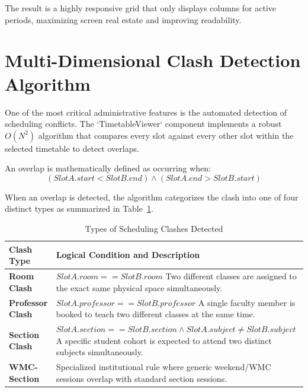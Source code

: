 The result is a highly responsive grid that only displays columns for active periods, maximizing screen real estate and improving readability.

\section{Multi-Dimensional Clash Detection Algorithm}

One of the most critical administrative features is the automated detection of scheduling conflicts. The `TimetableViewer` component implements a robust $O(N^2)$ algorithm that compares every slot against every other slot within the selected timetable to detect overlaps.

An overlap is mathematically defined as occurring when:
\begin{equation}
    (SlotA.start < SlotB.end) \land (SlotA.end > SlotB.start)
\end{equation}

When an overlap is detected, the algorithm categorizes the clash into one of four distinct types as summarized in Table~\ref{tab:clash_types}.

\begin{table}[htbp]
\centering
\caption{Types of Scheduling Clashes Detected}
\label{tab:clash_types}
\renewcommand{\arraystretch}{1.4}
\begin{tabularx}{\textwidth}{@{} l X @{}}
\toprule
\textbf{Clash Type} & \textbf{Logical Condition and Description} \\
\midrule
\textbf{Room Clash} & $SlotA.room == SlotB.room$ \newline Two different classes are assigned to the exact same physical space simultaneously. \\
\textbf{Professor Clash} & $SlotA.professor == SlotB.professor$ \newline A single faculty member is booked to teach two different classes at the same time. \\
\textbf{Section Clash} & $SlotA.section == SlotB.section \land SlotA.subject \neq SlotB.subject$ \newline A specific student cohort is expected to attend two distinct subjects simultaneously. \\
\textbf{WMC-Section} & Specialized institutional rule where generic weekend/WMC sessions overlap with standard section sessions. \\
\bottomrule
\end{tabularx}
\end{table}


